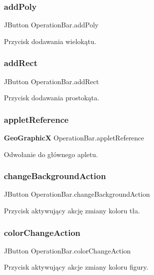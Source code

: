 \subsubsection{add\+Poly}
{\footnotesize\ttfamily J\+Button Operation\+Bar.\+add\+Poly}

Przycisk dodawania wielokątu. \mbox{\label{class_operation_bar_a33cae877bb167029955491e1319d1f57}} 
\subsubsection{add\+Rect}
{\footnotesize\ttfamily J\+Button Operation\+Bar.\+add\+Rect}

Przycisk dodawania prostokąta. \mbox{\label{class_operation_bar_a685ead7341a7cef4b79af4a980b640ca}} 
\subsubsection{applet\+Reference}
{\footnotesize\ttfamily \textbf{ Geo\+GraphicX} Operation\+Bar.\+applet\+Reference}

Odwołanie do głównego apletu. \mbox{\label{class_operation_bar_afef0595de60802e174541fbf7d25059f}} 
\subsubsection{change\+Background\+Action}
{\footnotesize\ttfamily J\+Button Operation\+Bar.\+change\+Background\+Action}

Przycisk aktywujący akcję zmiany koloru tła. \mbox{\label{class_operation_bar_ae834010488359b6eaf8246d604ead9f2}} 
\subsubsection{color\+Change\+Action}
{\footnotesize\ttfamily J\+Button Operation\+Bar.\+color\+Change\+Action}

Przycisk aktywujący akcje zmiany koloru figury. \mbox{\label{class_operation_bar_ac099d8aed8f41bdef2a28e4356ec2063}} 
